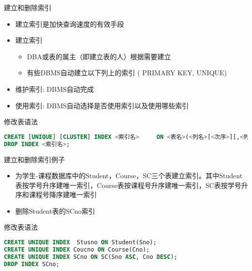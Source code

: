\begin{frame}[fragile]{建立和删除索引}
\begin{itemize}
    \item 建立索引是加快查询速度的有效手段
    \item 建立索引
    \begin{itemize}
        \item DBA或表的属主（即建立表的人）根据需要建立
        \item 有些DBMS自动建立以下列上的索引 ( PRIMARY  KEY, UNIQUE)
    \end{itemize}
    \item 维护索引: DBMS自动完成
    \item 使用索引: DBMS自动选择是否使用索引以及使用哪些索引
\end{itemize}
\begin{block}{修改表语法}
\begin{lstlisting}[language=SQL]
CREATE [UNIQUE] [CLUSTER] INDEX <索引名>     ON <表名>(<列名>[<次序>][,<列名>[<次序>] ]…);
DROP INDEX <索引名>;
\end{lstlisting}
\end{block}
\end{frame}

\begin{frame}[fragile]{建立和删除索引例子}
\begin{itemize}
    \item 为学生-课程数据库中的Student，Course，SC三个表建立索引。其中Student表按学号升序建唯一索引，Course表按课程号升序建唯一索引，SC表按学号升序和课程号降序建唯一索引
    \item 删除Student表的SCno索引
\end{itemize}
\begin{block}{修改表语法}
\begin{lstlisting}[language=SQL]
CREATE UNIQUE INDEX  Stusno ON Student(Sno);
CREATE UNIQUE INDEX Coucno ON Course(Cno);
CREATE UNIQUE INDEX SCno ON SC(Sno ASC, Cno DESC); 
DROP INDEX SCno;
\end{lstlisting}
\end{block}
\end{frame}



